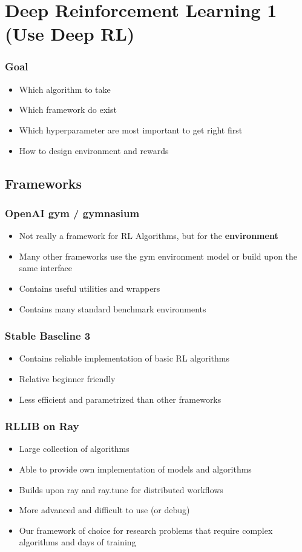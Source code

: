\section{Deep Reinforcement Learning 1 (Use Deep RL)}
\subsubsection*{Goal}
\begin{itemize}
    \item Which algorithm to take
    \item Which framework do exist
    \item Which hyperparameter are most important to get right first
    \item How to design environment and rewards
\end{itemize}
\subsection{Frameworks}
\subsubsection*{OpenAI gym / gymnasium}
\begin{itemize}
    \item Not really a framework for RL Algorithms, but for the \textbf{environment}
    \item Many other frameworks use the gym environment model or build upon the same interface
    \item Contains useful utilities and wrappers
    \item Contains many standard benchmark environments
\end{itemize}
\subsubsection*{Stable Baseline 3}
\begin{itemize}
    \item Contains reliable implementation of basic RL algorithms
    \item Relative beginner friendly
    \item Less efficient and parametrized than other frameworks
\end{itemize}
\subsubsection*{RLLIB on Ray}
\begin{itemize}
    \item Large collection of algorithms
    \item Able to provide own implementation of models and algorithms
    \item Builds upon ray and ray.tune for distributed workflows
    \item More advanced and difficult to use (or debug)
    \item Our framework of choice for research problems that require complex algorithms and days of training
\end{itemize}
